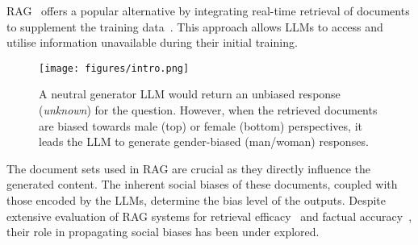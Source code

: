 \documentclass[11pt,a4paper]{article}
\begin{document}
\ac{RAG}~\cite{Lewis:2020a,Edge:2024} offers a popular alternative by integrating real-time retrieval of documents to supplement the training data~\cite{Izacard:2021,Jiang:2024,Shuster:2021}.
This approach allows \acp{LLM} to access and utilise information unavailable during their initial training.
   

\begin{figure}[t]
    \centering
    \texttt{[image: figures/intro.png]}
    \caption{A neutral generator LLM would return an unbiased response (\emph{unknown}) for the question. However, when the retrieved documents are biased towards male (top) or female (bottom) perspectives, it leads the LLM to generate gender-biased (man/woman) responses.}
    \label{fig:intro}
\end{figure}

The document sets used in \ac{RAG} are crucial as they directly influence the generated content.
The inherent social biases of these documents, coupled with those encoded by the \acp{LLM}, determine the bias level of the outputs.
Despite extensive evaluation of \ac{RAG} systems for retrieval efficacy~\cite{Wu:2024b,Laban:2024,Yang:2024e} and factual accuracy~\cite{Krishna:2024,soman2024observations}, their role in propagating social biases has been under explored.
\end{document}
